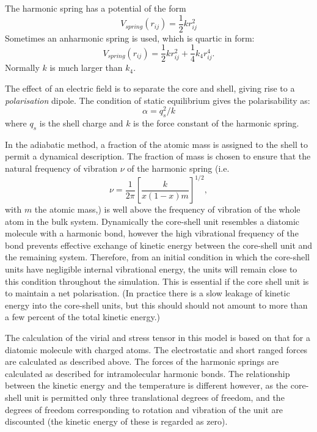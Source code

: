 The harmonic spring has a potential of the form
\begin{equation}
V_{spring}(r_{ij})=\frac{1}{2}k r_{ij}^{2}
\end{equation}
Sometimes an anharmonic spring is used, which is quartic in form:
\begin{equation}
V_{spring}(r_{ij})=\frac{1}{2}k r_{ij}^{2}+\frac{1}{4}k_{4} r_{ij}^{4}.
\end{equation}
Normally $k$ is much larger than $k_{4}$.

The effect of an electric field is to separate the core and shell, giving rise
to a {\em polarisation} dipole. The condition of static equilibrium gives the
polarisability as:
\begin{equation}
\alpha=q_{s}^{2}/k
\end{equation}
where $q_{s}$ is the shell charge and $k$ is the force constant of the
harmonic spring.

In the adiabatic method, a fraction of the atomic mass is assigned to
the shell to permit a dynamical description. The fraction of mass is
chosen to ensure that the natural frequency of vibration $\nu$ of the
harmonic spring (i.e.
\begin{equation}
\nu=\frac{1}{2\pi} \left [ \frac{k}{x(1-x)m} \right ]^{1/2},
\end{equation}
with $m$ the atomic mass,) is well above the frequency of vibration of
the whole atom in the bulk system. Dynamically the core-shell unit
resembles a diatomic molecule with a harmonic
bond, however the high vibrational frequency of
the bond prevents effective exchange of kinetic energy between the
core-shell unit and the remaining system.  Therefore, from an initial
condition in which the core-shell units have negligible internal
vibrational energy, the units will remain close to this condition
throughout the simulation. This is essential if the core shell unit is
to maintain a net polarisation.  (In practice
there is a slow leakage of kinetic energy into the core-shell units,
but this should should not amount to more than a few percent of the
total kinetic energy.)

The calculation of the virial and stress tensor in this model is based on
that for a diatomic molecule with charged atoms. The electrostatic and
short ranged forces are calculated as described above. The forces of
the harmonic springs are calculated as described for intramolecular
harmonic bonds. The relationship between the kinetic energy and the
temperature is different however, as the core-shell unit is permitted
only three translational degrees of freedom, and the degrees of
freedom corresponding to rotation and vibration of the unit are
discounted (the kinetic energy of these is regarded as zero).

